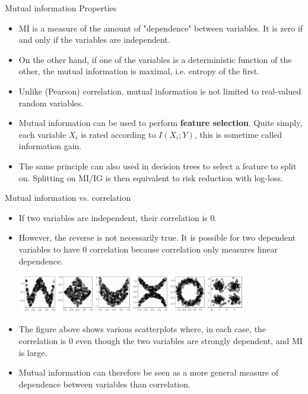 \documentclass[11pt,compress,t,notes=noshow, xcolor=table]{beamer}
\begin{document}
\begin{vbframe} {Mutual information Properties}
\begin{itemize}
  \item MI is a measure of the amount of "dependence" between variables. It is zero if and only if the variables are independent.
  \item On the other hand, if one of the variables is a deterministic function of the other, the mutual information is maximal, i.e. entropy of the first.
 \item Unlike (Pearson) correlation, mutual information is not limited to real-valued random variables.
    \item Mutual information can be used to perform \textbf{feature selection}. Quite simply, each variable $X_i$ is rated according to $I(X_i;Y)$, this is sometime called information gain.
  \item The same principle can also used in decision trees to select a feature to split on. Splitting on MI/IG is then equivalent to risk reduction with log-loss. 
\end{itemize}
\end{vbframe}
 

\begin{vbframe} {Mutual information vs. correlation}
  
  \begin{itemize}
    \item If two variables are independent, their correlation is 0.
    \item However, the reverse is not necessarily true. It is possible for two dependent variables to have 0 correlation because correlation only measures linear dependence.
    
\begin{center}
\includegraphics[width = 10cm ]{figure/correlation_plot.png} \\
\end{center}

    \item The figure above shows various scatterplots where, in each case, the correlation is 0 even though the two variables are strongly dependent, and MI is large. 
    \item Mutual information can therefore be seen as a more general measure of dependence between variables than correlation.
  \end{itemize}

\end{vbframe}
\end{document}
